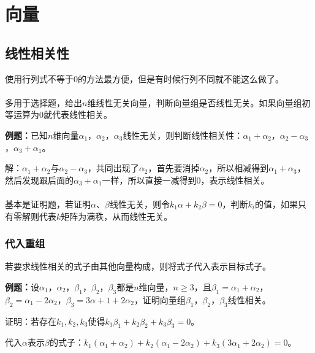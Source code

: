 
\section{向量}
\subsection{线性相关性}

使用行列式不等于$0$的方法最方便，但是有时候行列不同就不能这么做了。

\paragraph{}

多用于选择题，给出$n$维线性无关向量，判断向量组是否线性无关。如果向量组初等运算为0就代表线性相关。

\textbf{例题：}已知$n$维向量$\alpha_1$，$\alpha_2$，$\alpha_3$线性无关，则判断线性相关性：$\alpha_1+\alpha_2$，$\alpha_2-\alpha_3$，$\alpha_3+\alpha_1$。

解：$\alpha_1+\alpha_2$与$\alpha_2-\alpha_3$，共同出现了$\alpha_2$，首先要消掉$\alpha_2$，所以相减得到$\alpha_1+\alpha_3$，然后发现跟后面的$\alpha_3+\alpha_1$一样，所以直接一减得到0，表示线性相关。

\paragraph{}

基本是证明题，若证明$\alpha$、$\beta$线性无关，则令$k_1\alpha+k_2\beta=0$，判断$k_i$的值，如果只有零解则代表$k$矩阵为满秩，从而线性无关。

\subsubsection{代入重组}

若要求线性相关的式子由其他向量构成，则将式子代入表示目标式子。

\textbf{例题：}设$\alpha_1$，$\alpha_2$，$\beta_1$，$\beta_2$，$\beta_3$都是$n$维向量，$n\geqslant3$，且$\beta_1=\alpha_1+\alpha_2$，$\beta_2=\alpha_1-2\alpha_2$，$\beta_3=3\alpha+1+2\alpha_2$，证明向量组$\beta_1$，$\beta_2$，$\beta_3$线性相关。

证明：若存在$k_1,k_2,k_3$使得$k_1\beta_1+k_2\beta_2+k_3\beta_3=0$。

代入$\alpha$表示$\beta$的式子：$k_1(\alpha_1+\alpha_2)+k_2(\alpha_1-2\alpha_2)+k_3(3\alpha_1+2\alpha_2)=0$。

